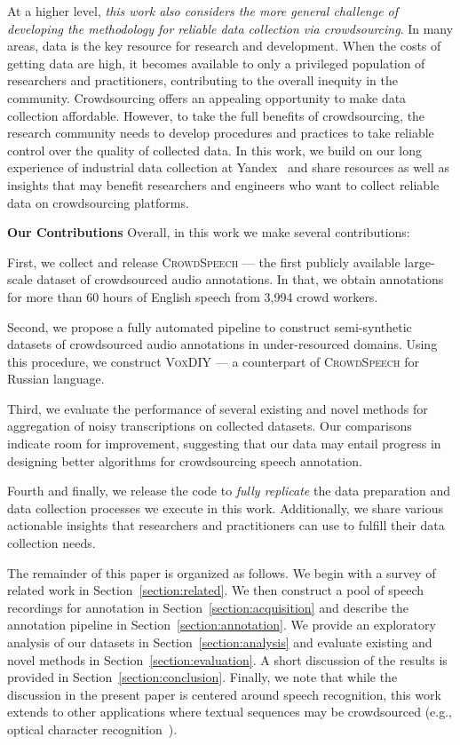\documentclass{article}
\newcommand{\speech}{\textsc{CrowdSpeech}}
\newcommand{\vox}{\textsc{VoxDIY}}
\begin{document}
At a higher level, \emph{this work also considers the more general challenge of developing the methodology for reliable data collection via crowdsourcing}. In many areas, data is the key resource for research and development. When the costs of getting data are high, it becomes available to only a privileged population of researchers and practitioners, contributing to the overall inequity in the community. Crowdsourcing offers an appealing opportunity to make data collection affordable. However, to take the full benefits of crowdsourcing, the research community needs to develop procedures and practices to take reliable control over the quality of collected data. In this work, we build on our long experience of industrial data collection at Yandex~\citep{drutsa20crowd, drutsa20crowd2, drutsa21crowd} and share resources as well as insights that may benefit researchers and engineers who want to collect reliable data on crowdsourcing platforms.

\textbf{Our Contributions} Overall, in this work we make several contributions:

First, we collect and release \speech{} --- the first publicly available large-scale dataset of crowdsourced audio annotations. In that, we obtain annotations for more than  $60$ hours of English speech from 3,994 crowd workers. 

Second, we propose a fully automated pipeline to construct semi-synthetic datasets of crowdsourced audio annotations in under-resourced domains. Using this procedure, we construct \vox{} --- a counterpart of \speech{} for Russian language.

Third, we evaluate the performance of several existing and novel methods for aggregation of noisy transcriptions on collected datasets. Our comparisons indicate room for improvement, suggesting that our data may entail progress in designing better algorithms for crowdsourcing speech annotation.

Fourth and finally, we release the code to \emph{fully replicate} the data preparation and data collection processes we execute in this work. Additionally, we share various actionable insights that researchers and practitioners can use to fulfill their data collection needs. 

The remainder of this paper is organized as follows. We begin with a survey of related work in Section~\ref{section:related}. We then construct a pool of speech recordings for annotation in Section~\ref{section:acquisition} and describe the annotation pipeline in Section~\ref{section:annotation}. We provide an exploratory analysis of our datasets in Section~\ref{section:analysis} and evaluate existing and novel methods in Section~\ref{section:evaluation}. A short discussion of the results is provided in Section~\ref{section:conclusion}. Finally, we note that while the discussion in the present paper is centered around speech recognition, this work extends to other applications where textual sequences may be crowdsourced (e.g., optical character recognition~\citep{chrons11making, clematide16ocr, vonahn08re}).
\end{document}
